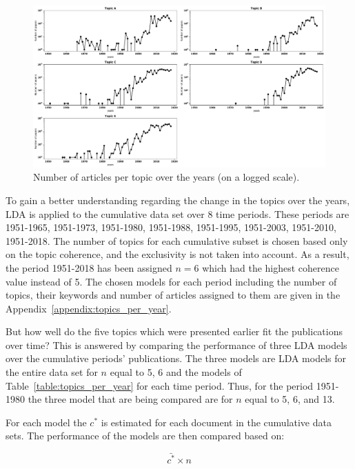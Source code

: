 \documentclass{article}
\theoremstyle{definition}
\begin{document}
\begin{figure}[!hbtp]
    \centering
    \includegraphics[width=\textwidth]{./assets/images/papers_per_topic_over_time.pdf}
    \caption{Number of articles per topic over the years (on a logged scale).}\label{fig:number_of_articles_per_topic}
\end{figure}

To gain a better understanding regarding the change in the topics over the years,
LDA is applied to the cumulative data set over 8 time periods. These periods are
1951-1965, 1951-1973, 1951-1980, 1951-1988, 1951-1995, 1951-2003, 1951-2010,
1951-2018. The number of topics for each cumulative subset is chosen based only
on the topic coherence, and the exclusivity is not taken into account. As a result,
the period 1951-2018 has been assigned \(n=6\) which had the highest coherence
value instead of 5. The chosen models for each period including the
number of topics, their keywords and number of articles assigned to them are
given in the Appendix~\ref{appendix:topics_per_year}.

But how well do the five topics which were presented earlier fit the
publications over time? This is answered by comparing the performance of three
LDA models over the cumulative periods' publications. The three models are LDA
models for the entire data set for \(n\) equal to 5, 6 and the models of
Table~\ref{table:topics_per_year} for each time period. Thus, for the period
1951-1980 the three model that are being compared are for $n$ equal to 5, 6, and
13.

For each model the \(c^*\) is estimated for each document in the cumulative data
sets. The performance of the models are then compared based on:

\begin{equation}\label{eq:ratio}
    \bar{c^*} \times n
\end{equation}
\end{document}
